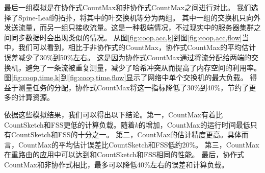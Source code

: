 最后一组模拟是在协作式CountMax和非协作式CountMax之间进行对比。
我们选择了Spine-Leaf的拓扑，将其中的叶交换机等分为两组。
其中一组的交换机只向外发送流量，而另一组只接收流量。这是一种极端情况，不过现实中的服务器集群之间同步数据时会出现类似的情况。
从图\ref{fig:coop,acc,k}到图\ref{fig:coop,acc,flow}当中，我们可以看到，相比于非协作式的CountMax，协作式CountMax的平均估计误差减少了30\%到50\%左右。
这是因为协作式CountMax通过将流分配给两端的交换机，避免了一条流被重复测量，减少了哈希冲突从而提高了内存空间的利用率。
图\ref{fig:coop,time,k}到\ref{fig:coop,time,flow}显示了网络中单个交换机的最大负载。
得益于测量任务的分配，协作式CountMax将这一指标降低了30\%到40\%，节约了更多的计算资源。

依据这些模拟结果，我们可以得出以下结论。第一，CountMax有着比CountSketch和FSS更低的计算负载。随着$k$的增加，CountMax的运行时间最低只有CountSketch和FSS的十分之一。
第二，CountMax的估计精度更高。具体而言，CountMax的平均估计误差比CountSketch和FSS低约20\%。
第三，CountMax在重路由的应用中可以达到和CountSketch和FSS相同的性能。
最后，协作式CountMax和非协作式相比，最多可以降低40\%左右的误差和计算负载。





